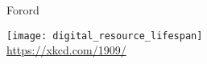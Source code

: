 \cleardoublepage
\begin{titlepage}
	\centering
	\vspace{3cm}
	{\Huge Forord \par} \vspace{0.5cm}
	{\texttt{[image: digital\_resource\_lifespan]}\\
		\tiny \url{https://xkcd.com/1909/} \par} \vspace{0.5cm}	
\end{titlepage}

